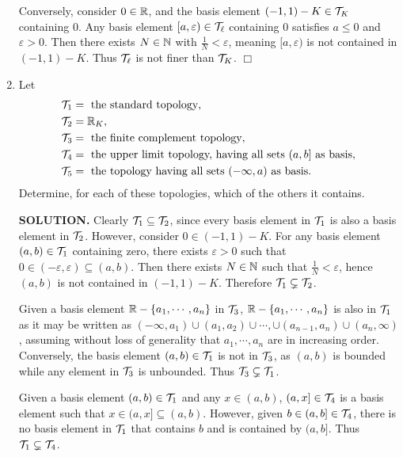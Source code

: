 \documentclass{article}
\begin{document}
\begin{enumerate}
    Conversely, consider $0 \in \mathbb{R}$, and the basis element $(-1, 1) - K \in \mathcal{T}_K$ containing $0$. Any basis element $[a, \varepsilon) \in \mathcal{T}_\ell$ containing $0$ satisfies $a \leq 0$ and $\varepsilon > 0$. Then there exists $N \in \mathbb{N}$ with $\frac{1}{N} < \varepsilon$, meaning $[a, \varepsilon)$ is not contained in $(-1, 1) - K$. Thus $\mathcal{T}_\ell$ is not finer than $\mathcal{T}_K$. $\Box$

    \item Let 
    \begin{align*}
        \mathcal{T}_1 &= \text{ the standard topology}, \\
        \mathcal{T}_2 &= \mathbb{R}_K, \\
        \mathcal{T}_3 &= \text{ the finite complement topology}, \\
        \mathcal{T}_4 &= \text{ the upper limit topology, having all sets }(a, b] \text{ as basis}, \\
        \mathcal{T}_5 &= \text{ the topology having all sets } (-\infty, a) \text{ as basis}.
    \end{align*}
    Determine, for each of these topologies, which of the others it contains.

    {\bf SOLUTION.} Clearly $\mathcal{T}_1 \subseteq \mathcal{T}_2$, since every basis element in $\mathcal{T}_1$ is also a basis element in $\mathcal{T}_2$. However, consider $0 \in (-1, 1) - K$. For any basis element $(a, b) \in \mathcal{T}_1$ containing zero, there exists $\varepsilon > 0$ such that $0 \in (-\varepsilon, \varepsilon) \subseteq (a, b)$. Then there exists $N \in \mathbb{N}$ such that $\frac{1}{N} < \varepsilon$, hence $(a, b)$ is not contained in $(-1, 1) - K$. Therefore $\mathcal{T}_1 \subsetneq \mathcal{T}_2$.

    Given a basis element $\mathbb{R} - \{a_1, \cdots, a_n\}$ in $\mathcal{T}_3$, $\mathbb{R} - \{a_1, \cdots, a_n\}$ is also in $\mathcal{T}_1$ as it may be written as $(-\infty, a_1) \cup (a_1, a_2) \cup \cdots, \cup (a_{n-1}, a_n) \cup (a_n, \infty)$, assuming without loss of generality that $a_1, \cdots, a_n$ are in increasing order. Conversely, the basis element $(a, b) \in \mathcal{T}_1$ is not in $\mathcal{T}_3$, as $(a, b)$ is bounded while any element in $\mathcal{T}_3$ is unbounded. Thus $\mathcal{T}_3 \subsetneq \mathcal{T}_1$.

    Given a basis element $(a, b) \in \mathcal{T}_1$ and any $x \in (a, b)$, $(a, x] \in \mathcal{T}_4$ is a basis element such that $x \in (a, x] \subseteq (a, b).$ However, given $b \in (a, b] \in \mathcal{T}_4$, there is no basis element in $\mathcal{T}_1$ that contains $b$ and is contained by $(a, b]$. Thus $\mathcal{T}_1 \subsetneq \mathcal{T}_4$.


\end{enumerate}
\end{document}
